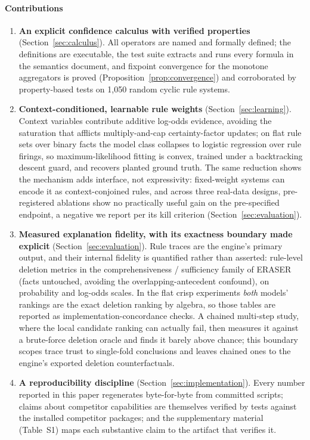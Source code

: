 \paragraph{Contributions}
\begin{enumerate}
\item \textbf{An explicit confidence calculus with verified properties}
  (Section~\ref{sec:calculus}). All operators are named and formally
  defined; the definitions are executable, the test suite extracts and
  runs every formula in the semantics document, and fixpoint
  convergence for the monotone aggregators is proved
  (Proposition~\ref{prop:convergence}) and corroborated by
  property-based tests on 1{,}050 random cyclic rule systems.
\item \textbf{Context-conditioned, learnable rule weights}
  (Section~\ref{sec:learning}). Context variables contribute additive
  log-odds evidence, avoiding the saturation that afflicts
  multiply-and-cap certainty-factor updates; on flat rule sets over
  binary facts the model class collapses to logistic regression over
  rule firings, so maximum-likelihood fitting is convex, trained under
  a backtracking descent guard, and recovers planted ground truth. The
  same reduction shows the mechanism adds interface, not expressivity:
  fixed-weight systems can encode it as context-conjoined rules,
  and across three real-data designs, pre-registered ablations show no
  practically useful gain on the pre-specified endpoint, a negative
  we report per its kill criterion (Section~\ref{sec:evaluation}).
\item \textbf{Measured explanation fidelity, with its exactness
  boundary made explicit}
  (Section~\ref{sec:evaluation}). Rule traces are the engine's primary
  output, and their internal fidelity is quantified rather than
  asserted: rule-level deletion metrics in the comprehensiveness /
  sufficiency family of ERASER~\cite{deyoung2020} (facts untouched,
  avoiding the overlapping-antecedent confound), on probability and
  log-odds scales. In the flat crisp experiments \emph{both} models'
  rankings are the exact deletion ranking by algebra, so those tables
  are reported as implementation-concordance checks. A chained
  multi-step study, where the local candidate ranking can actually
  fail, then measures it against a brute-force deletion oracle
  and finds it barely above chance; this boundary
  scopes trace trust to single-fold conclusions and leaves chained
  ones to the engine's exported deletion counterfactuals.
\item \textbf{A reproducibility discipline}
  (Section~\ref{sec:implementation}). Every number reported in this
  paper regenerates byte-for-byte from committed scripts; claims about
  competitor capabilities are themselves verified by tests against the
  installed competitor packages; and the supplementary material
  (Table~S1) maps
  each substantive claim to the artifact that verifies it.
\end{enumerate}

